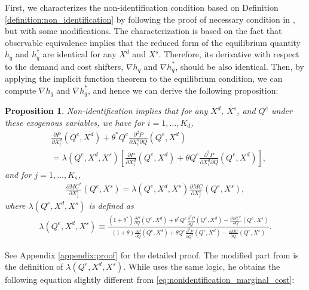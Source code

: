 \documentclass[11pt, a4paper]{article}
\newtheorem{proposition}{Proposition}
\theoremstyle{remark}
\begin{document}
First, we characterizes the non-identification condition based on Definition \ref{definition:non_identification} by following the proof of necessary condition in \citet{lau1982identifying}, but with some modifications.
The characterization is based on the fact that observable equivalence implies that the reduced form of the equilibrium quantity $h_q$ and $h_q^{*}$ are identical for any $X^{d}$ and $X^{s}$.
Therefore, its derivative with respect to the demand and cost shifters, $\nabla h_q$ and $\nabla h_q^{*}$, should be also identical.
Then, by applying the implicit function theorem to the equilibrium condition, we can compute $\nabla h_q$ and $\nabla h_q^{*}$, and hence we can derive the following proposition:
\begin{proposition}\label{proposition:nonidentification_charaterization}
    Non-identification implies that for any $X^{d}$, $X^{s}$, and $Q^e$ under these exogenous variables, we have for $i = 1, \ldots, K_d$,
    \begin{align}
        &\frac{\partial P}{\partial X^{d}_{i}}(Q^e, X^{d}) + \theta^{*} Q^e \frac{\partial^2 P}{\partial X^{d}_{i}\partial Q}(Q^e, X^{d})\\  
        &= \lambda(Q^e, X^{d}, X^{s})\left[ \frac{\partial P}{\partial X^{d}_{i}}(Q^e, X^{d}) + \theta Q^e \frac{\partial^2 P}{\partial X^{d}_{i}\partial Q}(Q^e, X^{d}) \right], \label{eq:nonidentification_demand}
    \end{align}
    and for $j = 1,\ldots, K_s$,
    \begin{align}
        \frac{\partial MC^{*}}{\partial X^{s}_j}(Q^e, X^{s}) = \lambda(Q^e, X^{d}, X^{s}) \frac{\partial MC}{\partial X^{s}_j}(Q^e, X^{s}),\label{eq:nonidentification_marginal_cost}
    \end{align}
    where $\lambda(Q^e, X^{d}, X^{s})$ is defined as
    \begin{align}
        \lambda(Q^e, X^{d}, X^{s}) \equiv \frac{(1+\theta^{*})\frac{\partial P}{\partial Q}(Q^e, X^{d}) + \theta^{*} Q^e\frac{\partial^2 P}{\partial Q^2}(Q^e, X^{d}) - \frac{\partial MC^{*}}{\partial Q}(Q^e, X^{s})}{(1+\theta)\frac{\partial P}{\partial Q}(Q^e, X^{d}) + \theta Q^e\frac{\partial^2 P}{\partial Q^2}(Q^e, X^{d}) - \frac{\partial MC}{\partial Q}(Q^e, X^{s})}. \label{eq:lambda_foc}
    \end{align}
\end{proposition}
See Appendix \ref{appendix:proof} for the detailed proof.
The modified part from \citet{lau1982identifying} is the definition of $\lambda(Q^e, X^{d}, X^{s})$.
While \citet{lau1982identifying} uses the same logic, he obtains the following equation slightly different from \eqref{eq:nonidentification_marginal_cost}:
\end{document}
